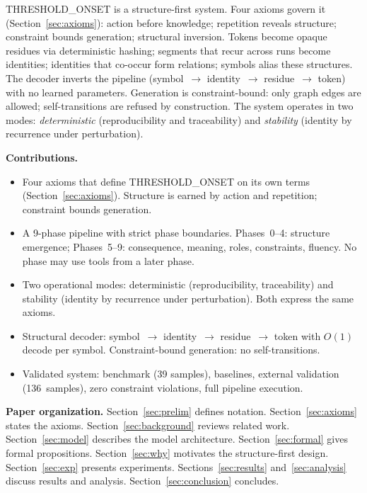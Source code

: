 \documentclass[10pt]{article}
\begin{document}
THRESHOLD\_ONSET is a structure-first system. Four axioms govern it
(Section~\ref{sec:axioms}): action before knowledge; repetition reveals structure;
constraint bounds generation; structural inversion. Tokens become opaque residues via
deterministic hashing; segments that recur across runs become identities; identities
that co-occur form relations; symbols alias these structures. The decoder inverts the
pipeline (symbol~$\rightarrow$ identity~$\rightarrow$ residue~$\rightarrow$ token) with
no learned parameters. Generation is constraint-bound: only graph edges are allowed;
self-transitions are refused by construction. The system operates in two modes:
\emph{deterministic} (reproducibility and traceability) and \emph{stability} (identity
by recurrence under perturbation).

\textbf{Contributions.}
\begin{itemize}
  \item Four axioms that define THRESHOLD\_ONSET on its own terms
        (Section~\ref{sec:axioms}). Structure is earned by action and repetition;
        constraint bounds generation.
  \item A 9-phase pipeline with strict phase boundaries. Phases~0--4: structure
        emergence; Phases~5--9: consequence, meaning, roles, constraints, fluency.
        No phase may use tools from a later phase.
  \item Two operational modes: deterministic (reproducibility, traceability) and
        stability (identity by recurrence under perturbation). Both express the same
        axioms.
  \item Structural decoder: symbol~$\rightarrow$ identity~$\rightarrow$
        residue~$\rightarrow$ token with $O(1)$ decode per symbol. Constraint-bound
        generation: no self-transitions.
  \item Validated system: benchmark (39 samples), baselines, external validation
        (136~samples), zero constraint violations, full pipeline execution.
\end{itemize}

\textbf{Paper organization.}
Section~\ref{sec:prelim} defines notation. Section~\ref{sec:axioms} states the axioms.
Section~\ref{sec:background} reviews related work. Section~\ref{sec:model} describes
the model architecture. Section~\ref{sec:formal} gives formal propositions.
Section~\ref{sec:why} motivates the structure-first design.
Section~\ref{sec:exp} presents experiments. Sections~\ref{sec:results}
and~\ref{sec:analysis} discuss results and analysis.
Section~\ref{sec:conclusion} concludes.
\end{document}
